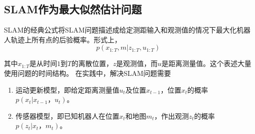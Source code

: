 \subsection{SLAM作为最大似然估计问题}


SLAM的经典公式将SLAM问题描述成给定测距输入和观测值的情况下最大化机器人轨迹上所有点的后验概率。形式上，
\begin{equation}
p(x_{1:T},m|z_{1:T},u_{1:T})
\end{equation}

其中$ x_{1:T} $是从时间$1$到$T$的离散位置，$z$是观测值，而$u$是距离测量值。这个表述大量使用问题的时间结构。 在实践中，解决SLAM问题需要


\begin{enumerate}
\item 运动更新模型，即给定距离测量值$u_t$及位置$ x_{t-1}$，位置$x_t$的概率$ p(x_t | x_{t-1}，u_t)$。
\item 传感器模型，即已知机器人在位置$x_t$和地图$m_t$，作出观测$z_t$的概率$ p(z_t | x_t，m_t)$。
\end{enumerate}


